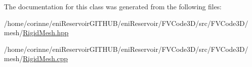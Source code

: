 The documentation for this class was generated from the following files\+:\begin{DoxyCompactItemize}
\item 
/home/corinne/eni\+Reservoir\+G\+I\+T\+H\+U\+B/eni\+Reservoir/\+F\+V\+Code3\+D/src/\+F\+V\+Code3\+D/mesh/\hyperlink{RigidMesh_8hpp}{Rigid\+Mesh.\+hpp}\item 
/home/corinne/eni\+Reservoir\+G\+I\+T\+H\+U\+B/eni\+Reservoir/\+F\+V\+Code3\+D/src/\+F\+V\+Code3\+D/mesh/\hyperlink{RigidMesh_8cpp}{Rigid\+Mesh.\+cpp}\end{DoxyCompactItemize}
